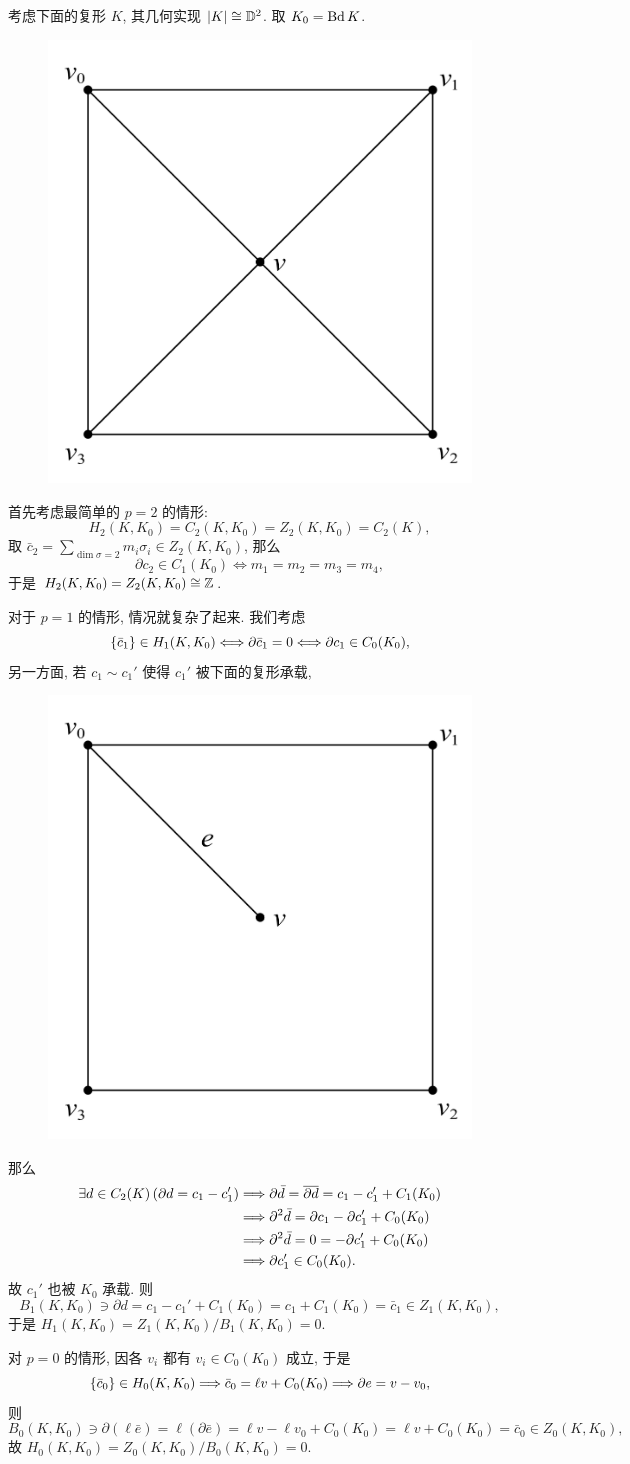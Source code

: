 \begin{Example}
	考虑下面的复形 $ K $, 其几何实现 $ \abs{K}\cong\D^2 $. 取 $ K_0=\Bd K $.
	\begin{figure}[htbp]
		\centering
		\includegraphics[width=0.2\linewidth]{figures/Sec8-1.png}
	\end{figure}
	首先考虑最简单的 $ p=2 $ 的情形:
	\[
		H_2(K,K_0)=C_2(K,K_0)=Z_2(K,K_0)=C_2(K),
	\]
	取 $ \bar{c}_2=\sum_{\dim\sigma=2}m_i\sigma_i\in Z_2(K,K_0) $, 那么
	\[
		\partial c_2\in C_1(K_0)\Longleftrightarrow m_1=m_2=m_3=m_4,
	\]
	于是 $ H_2(K,K_0)=Z_2(K,K_0)\cong\Z $.

	对于 $ p=1 $ 的情形, 情况就复杂了起来. 我们考虑
	\[
		\set{\bar{c}_1}\in H_1(K,K_0)\Longleftrightarrow\partial\bar{c}_1=0\Longleftrightarrow\partial c_1\in C_0(K_0),
	\]
	另一方面, 若 $ c_1\sim c_1' $ 使得 $ c_1' $ 被下面的复形承载,
	\begin{figure}[htbp]
		\centering
		\includegraphics[width=0.2\linewidth]{figures/Sec8-2.png}
	\end{figure}
	那么
	\[
		\begin{aligned}
			\exists d\in C_2(K)\,(\partial d=c_1-c_1')&\Longrightarrow\partial\bar{d}=\baro{\partial d}=c_1-c_1'+C_1(K_0)\\
			&\Longrightarrow \partial^2\bar{d}=\partial c_1-\partial c_1'+C_0(K_0)\\
			&\Longrightarrow \partial^2\bar{d}=0=-\partial c_1'+C_0(K_0)\\
			&\Longrightarrow \partial c_1'\in C_0(K_0).
		\end{aligned}
	\]
	故 $ c_1' $ 也被 $ K_0 $ 承载. 则
	\[
		B_1(K,K_0)\ni\partial d=c_1-c_1'+C_1(K_0)=c_1+C_1(K_0)=\bar{c}_1\in Z_1(K,K_0),
	\]
	于是 $ H_1(K,K_0)=Z_1(K,K_0)/B_1(K,K_0)=0 $.

	对 $ p=0 $ 的情形, 因各 $ v_i $ 都有 $ v_i\in C_0(K_0) $ 成立, 于是
	\[
		\set{\bar{c}_0}\in H_0(K,K_0)\Longrightarrow\bar{c}_0=\ell v+C_0(K_0)\Longrightarrow\partial e=v-v_0,
	\]
	则
	\[
		B_0(K,K_0)\ni\partial(\ell\bar{e})=\ell(\partial\bar{e})=\ell v-\ell v_0+C_0(K_0)=\ell v+C_0(K_0)=\bar{c}_0\in Z_0(K,K_0),
	\]
	故 $ H_0(K,K_0)=Z_0(K,K_0)/B_0(K,K_0)=0 $.
\end{Example}

